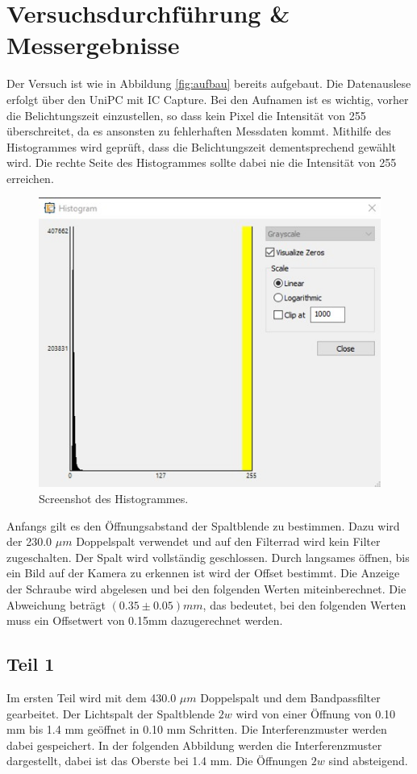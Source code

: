 \documentclass[12pt,a4paper,twoside]{article}
\begin{document}
\section{Versuchsdurchführung \& Messergebnisse} %
Der Versuch ist wie in Abbildung \ref{fig:aufbau} bereits aufgebaut. Die Datenauslese erfolgt über den UniPC mit IC Capture. 
Bei den Aufnamen ist es wichtig, vorher die Belichtungszeit einzustellen, so dass kein Pixel die Intensität von 255 überschreitet, da es ansonsten zu fehlerhaften Messdaten kommt. 
Mithilfe des Histogrammes wird geprüft, dass die Belichtungszeit dementsprechend gewählt wird. Die rechte Seite des Histogrammes sollte dabei nie die Intensität von 255 erreichen. 

\begin{figure}[H]
    \centering
    \includegraphics[width=0.7\linewidth]{nudes/histogramm.jpg}
    \caption{Screenshot des Histogrammes. }
    \label{fig:histogram}
\end{figure}

\noindent
Anfangs gilt es den Öffnungsabstand der Spaltblende zu bestimmen. Dazu wird der 230.0 $\mu m$ Doppelspalt verwendet und auf den Filterrad wird kein Filter zugeschalten. 
Der Spalt wird vollständig geschlossen. Durch langsames öffnen, bis ein Bild auf der Kamera zu erkennen ist wird der Offset bestimmt. Die Anzeige der Schraube wird abgelesen und bei den folgenden Werten miteinberechnet. 
Die Abweichung beträgt $(0.35 \pm 0.05) mm$, das bedeutet, bei den folgenden Werten muss ein Offsetwert von 0.15mm dazugerechnet werden. 

\subsection{Teil 1}
Im ersten Teil wird mit dem 430.0 $\mu m$ Doppelspalt und dem Bandpassfilter gearbeitet. 
Der Lichtspalt der Spaltblende $2w$ wird von einer Öffnung von 0.10 mm bis 1.4 mm geöffnet in 0.10 mm Schritten. Die Interferenzmuster werden dabei gespeichert. 
In der folgenden Abbildung werden die Interferenzmuster dargestellt, dabei ist das Oberste bei 1.4 mm. Die Öffnungen $2w$ sind absteigend. 
\end{document}

